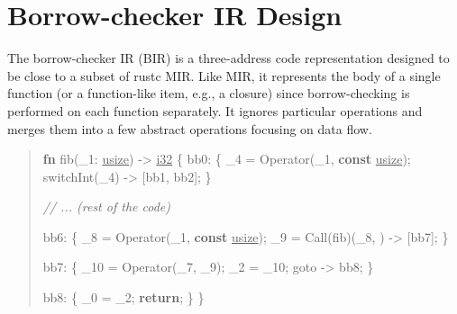 \documentclass[
  11pt,
  twoside,symmetric]{report}
\newenvironment{Shaded}{}{}
\newcommand{\CommentTok}[1]{\textit{#1}}
\newcommand{\ControlFlowTok}[1]{\textbf{#1}}
\newcommand{\DataTypeTok}[1]{\underline{#1}}
\newcommand{\KeywordTok}[1]{\textbf{#1}}
\newcommand{\NormalTok}[1]{#1}
\newcommand{\OperatorTok}[1]{#1}
\begin{document}
\hypertarget{borrow-checker-ir-design}{%
\section{Borrow-checker IR Design}\label{borrow-checker-ir-design}}

The borrow-checker IR (BIR) is a three-address code representation
designed to be close to a subset of rustc MIR. Like MIR, it represents
the body of a single function (or a function-like item, e.g., a closure)
since borrow-checking is performed on each function separately. It
ignores particular operations and merges them into a few abstract
operations focusing on data flow.

\begin{quote}
\begin{Shaded}
\begin{Highlighting}[]
\KeywordTok{fn}\NormalTok{ fib(\_1}\OperatorTok{:} \DataTypeTok{usize}\NormalTok{) }\OperatorTok{{-}\textgreater{}} \DataTypeTok{i32} \OperatorTok{\{}
\NormalTok{    bb0}\OperatorTok{:} \OperatorTok{\{}
\NormalTok{        \_4 }\OperatorTok{=}\NormalTok{ Operator(\_1}\OperatorTok{,} \KeywordTok{const} \DataTypeTok{usize}\NormalTok{)}\OperatorTok{;}
\NormalTok{        switchInt(\_4) }\OperatorTok{{-}\textgreater{}}\NormalTok{ [bb1}\OperatorTok{,}\NormalTok{ bb2]}\OperatorTok{;}
    \OperatorTok{\}}

    \CommentTok{// ... (rest of the code)}

\NormalTok{    bb6}\OperatorTok{:} \OperatorTok{\{}
\NormalTok{        \_8 }\OperatorTok{=}\NormalTok{ Operator(\_1}\OperatorTok{,} \KeywordTok{const} \DataTypeTok{usize}\NormalTok{)}\OperatorTok{;}
\NormalTok{        \_9 }\OperatorTok{=}\NormalTok{ Call(fib)(\_8}\OperatorTok{,}\NormalTok{ ) }\OperatorTok{{-}\textgreater{}}\NormalTok{ [bb7]}\OperatorTok{;}
    \OperatorTok{\}}

\NormalTok{    bb7}\OperatorTok{:} \OperatorTok{\{}
\NormalTok{        \_10 }\OperatorTok{=}\NormalTok{ Operator(\_7}\OperatorTok{,}\NormalTok{ \_9)}\OperatorTok{;}
\NormalTok{        \_2 }\OperatorTok{=}\NormalTok{ \_10}\OperatorTok{;}
\NormalTok{        goto }\OperatorTok{{-}\textgreater{}}\NormalTok{ bb8}\OperatorTok{;}
    \OperatorTok{\}}

\NormalTok{    bb8}\OperatorTok{:} \OperatorTok{\{}
\NormalTok{        \_0 }\OperatorTok{=}\NormalTok{ \_2}\OperatorTok{;}
        \ControlFlowTok{return}\OperatorTok{;}
    \OperatorTok{\}}
\OperatorTok{\}}
\end{Highlighting}
\end{Shaded}
\end{quote}
\end{document}
